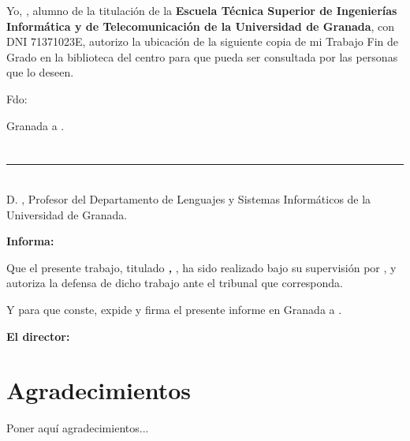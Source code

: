 Yo, \textbf{\myName}, alumno de la titulación \myDegree de la \textbf{Escuela Técnica Superior
de Ingenierías Informática y de Telecomunicación de la Universidad de Granada}, con DNI 71371023E, autorizo la
ubicación de la siguiente copia de mi Trabajo Fin de Grado en la biblioteca del centro para que pueda ser
consultada por las personas que lo deseen.

\vspace{6cm}

\noindent Fdo: \myName

\vspace{2cm}

\begin{flushright}
Granada a \myTime .
\end{flushright}


\chapter*{}
\thispagestyle{empty}

\noindent\rule[-1ex]{\textwidth}{2pt}\\[4.5ex]

D. \textbf{\myProf}, Profesor del Departamento de Lenguajes y Sistemas Informáticos de la Universidad de Granada.

\vspace{0.5cm}

\textbf{Informa:}

\vspace{0.5cm}

Que el presente trabajo, titulado \textit{\textbf{\myTitle, \mySubtitle}},
ha sido realizado bajo su supervisión por \textbf{\myName}, y autoriza la defensa de dicho trabajo ante el tribunal
que corresponda.

\vspace{0.5cm}

Y para que conste, expide y firma el presente informe en Granada a \myTime.

\vspace{1cm}

\textbf{El director:}

\vspace{5cm}

\noindent \textbf{\myProf}

\chapter*{Agradecimientos}
\thispagestyle{empty}

       \vspace{1cm}


Poner aquí agradecimientos...

